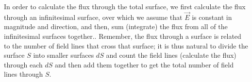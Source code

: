 In order to calculate the flux through the total surface, we first calculate the flux through an infinitesimal surface, over which we assume that $\vec E$ is constant in magnitude and direction, and then, sum (integrate) the flux from all of the infinitesimal surfaces together.. Remember, the flux through a surface is related to the number of field lines that cross that surface; it is thus natural to divide the surface $S$ into smaller surfaces $dS$ and count the field lines (calculate the flux) through each $dS$ and then add them together to get the total number of field lines through $S$.
